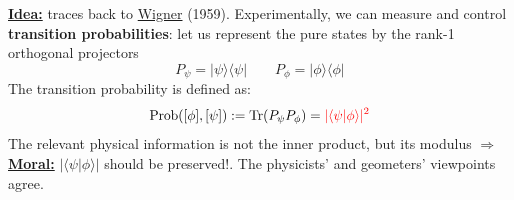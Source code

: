 \documentclass[../main.tex]{subfiles}
\begin{document}
 \underline{\textbf{Idea:}} traces back to \href{https://en.wikipedia.org/wiki/Eugene_Wigner}{Wigner} (1959). Experimentally, we can measure and control \textbf{transition probabilities}: let us represent the pure states by the rank-1 orthogonal projectors \[
P_{\psi}=|\psi\rangle\langle\psi|\qquad P_{\phi}=|\phi\rangle\langle\phi|
\]
The transition probability is defined as:
\[
\text{Prob}([\phi],[\psi]):=\Tr(P_{\psi}P_{\phi})={\color{red}|\langle\psi|\phi\rangle|^2}
\]
The relevant physical information is not the inner product, but its modulus $\Rightarrow$ \underline{\textbf{Moral:}} {\color{red}$|\langle\psi|\phi\rangle|$ should be preserved!}. The physicists' and geometers' viewpoints agree.
\end{document}
